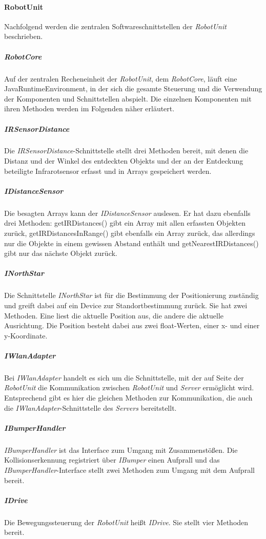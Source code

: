     \paragraph{RobotUnit}\label{robotunit}
    		Nachfolgend werden die zentralen Softwareschnittstellen der \emph{RobotUnit} beschrieben.
    	\subparagraph{RobotCore}\label{robotcore}
    		Auf der zentralen Recheneinheit der \emph{RobotUnit}, dem \emph{RobotCore}, läuft eine JavaRuntimeEnvironment, in der sich die gesamte Steuerung und die Verwendung der Komponenten und Schnittstellen abspielt.
    		Die einzelnen Komponenten mit ihren Methoden werden im Folgenden näher erläutert.
    	\subparagraph{IRSensorDistance}\label{irsensordistance}
    		Die \emph{IRSensorDistance}-Schnittstelle stellt drei Methoden bereit, mit denen die Distanz und der Winkel des entdeckten Objekts und der an der Entdeckung beteiligte Infrarotsensor erfasst und in Arrays gespeichert werden.
    	\subparagraph{IDistanceSensor}\label{idistancesensor}
    		Die besagten Arrays kann der \emph{IDistanceSensor} auslesen.
    		Er hat dazu ebenfalls drei Methoden: getIRDistances() gibt ein Array mit allen erfassten Objekten zurück, getIRDistancesInRange() gibt ebenfalls ein Array zurück, das allerdings nur die Objekte in einem gewissen Abstand enthält und getNearestIRDistances() gibt nur das nächste Objekt zurück.
    	\subparagraph{INorthStar}\label{inorthstar}
    		Die Schnittstelle \emph{INorthStar} ist für die Bestimmung der Positionierung zuständig und greift dabei auf ein Device zur Standortbestimmung zurück.
    		Sie hat zwei Methoden.
    		Eine liest die aktuelle Position aus, die andere die aktuelle Ausrichtung.
    		Die Position besteht dabei aus zwei float-Werten, einer x- und einer y-Koordinate.
    	\subparagraph{IWlanAdapter}\label{iwlanadapter}
    		Bei \emph{IWlanAdapter} handelt es sich um die Schnittstelle, mit der auf Seite der \emph{RobotUnit} die Kommunikation zwischen \emph{RobotUnit} und \emph{Server} ermöglicht wird.
    		Entsprechend gibt es hier die gleichen Methoden zur Kommunikation, die auch die \emph{IWlanAdapter}-Schnittstelle des \emph{Servers} bereitstellt.
    	\subparagraph{IBumperHandler}\label{ibumperhandler}
    		\emph{IBumperHandler} ist das Interface zum Umgang mit Zusammenstößen.
    		Die Kollisionserkennung registriert über \emph{IBumper} einen Aufprall und das \emph{IBumperHandler}-Interface stellt zwei Methoden zum Umgang mit dem Aufprall bereit.
    	\subparagraph{IDrive}\label{idrive}
    		Die Bewegungssteuerung der \emph{RobotUnit} heißt \emph{IDrive}.
    		Sie stellt vier Methoden bereit.
